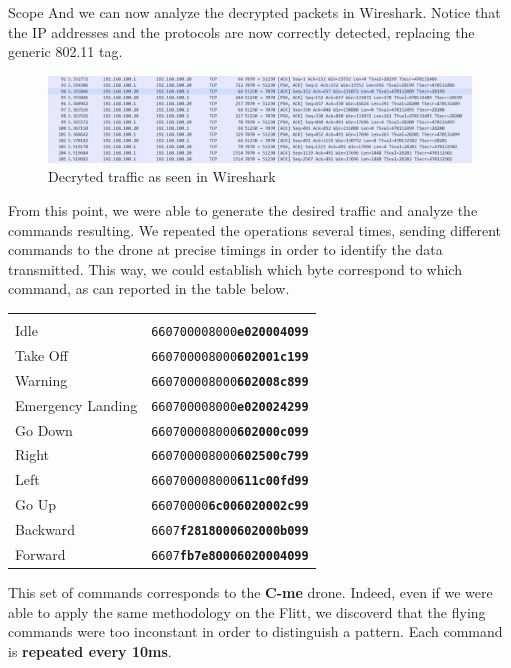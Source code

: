 \begin{chaptercover}{Scope}
And we can now analyze the decrypted packets in Wireshark. Notice that the IP addresses and the protocols are now correctly detected, replacing the generic 802.11 tag.

\begin{figure}[H]
  \centering
  \includegraphics[width=\linewidth]{figures/traffic-analysis-decrypted-packets}
  \caption{Decryted traffic as seen in Wireshark}
  \label{fig:traffic-analysis-decrypted-packets}
\end{figure}

From this point, we were able to generate the desired traffic and analyze the commands resulting. We repeated the operations several times, sending different commands to the drone at precise timings in order to identify the data transmitted. This way, we could establish which byte correspond to which command, as can reported in the table below.

\begingroup
\renewcommand*{\arraystretch}{1.3}
\begin{center}
  \begin{tabular}{L{6cm}L{8cm}}
   &  \\
  Idle &              \texttt{660700008000\textbf{e020004099}} \\
  Take Off &          \texttt{660700008000\textbf{602001c199}} \\
  Warning &           \texttt{660700008000\textbf{602008c899}} \\
  Emergency Landing & \texttt{660700008000\textbf{e020024299}} \\
  Go Down &           \texttt{660700008000\textbf{602000c099}} \\
  Right &             \texttt{660700008000\textbf{602500c799}} \\
  Left &              \texttt{660700008000\textbf{611c00fd99}} \\
  Go Up &             \texttt{66070000\textbf{6c006020002c99}} \\
  Backward &          \texttt{6607\textbf{f2818000602000b099}} \\
  Forward &           \texttt{6607\textbf{fb7e80006020004099}} \\
\end{tabular}
\end{center}
\endgroup

This set of commands corresponds to the \textbf{C-me} drone. Indeed, even if we were able to apply the same methodology on the Flitt, we discoverd that the flying commands were too inconstant in order to distinguish a pattern. Each command is \textbf{repeated every 10ms}.

\end{chaptercover}

